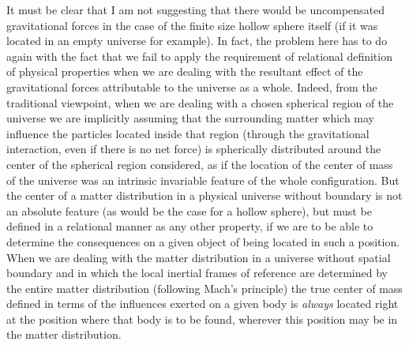 \documentclass[notitlepage,12pt]{report}
\begin{document}
It must be clear that I am not suggesting that there would be uncompensated gravitational forces in the case of the finite size hollow sphere itself (if it was located in an empty universe for example). In fact, the problem here has to do again with the fact that we fail to apply the requirement of relational definition of physical properties when we are dealing with the resultant effect of the gravitational forces attributable to the universe as a whole. Indeed, from the traditional viewpoint, when we are dealing with a chosen spherical region of the universe we are implicitly assuming that the surrounding matter which may influence the particles located inside that region (through the gravitational interaction, even if there is no net force) is spherically distributed around the center of the spherical region considered, as if the location of the center of mass of the universe was an intrinsic invariable feature of the whole configuration. But the center of a matter distribution in a physical universe without boundary is not an absolute feature (as would be the case for a hollow sphere), but must be defined in a relational manner as any other property, if we are to be able to determine the consequences on a given object of being located in such a position. When we are dealing with the matter distribution in a universe without spatial boundary and in which the local inertial frames of reference are determined by the entire matter distribution (following Mach's principle) the true center of mass defined in terms of the influences exerted on a given body is \textit{always} located right at the position where that body is to be found, wherever this position may be in the matter distribution.
\end{document}
